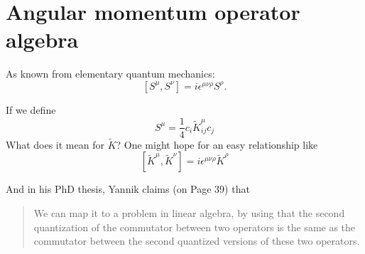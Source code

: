 \documentclass{article}
\newcommand{\ktilde}{\tilde{K}}
\begin{document}
\section{Angular momentum operator algebra}

As known from elementary quantum mechanics:
\begin{equation}
  \label{spinlaw}
  \left[S^\mu,S^\nu\right] = i \epsilon^{\mu\nu\rho} S^\rho .
\end{equation}

If we define
\begin{equation}
  \label{spinoperators}
  S^\mu = \frac{1}{4} c_i \ktilde^\mu_{ij}c_j
\end{equation}
What does it mean for $\ktilde$? One might hope for an easy relationship like
\begin{equation}
  \label{expectedkrelations}
  \left[\ktilde^\mu,\ktilde^\nu\right] = i \epsilon^{\mu\nu\rho} \ktilde^\rho
\end{equation}

And in his PhD thesis, Yannik claims (on Page 39) that

\begin{quote}
We can map it to a problem in linear
algebra, by using that the second quantization of the commutator between two
operators is the same as the commutator between the second quantized versions of
these two operators.
\end{quote}
\end{document}
